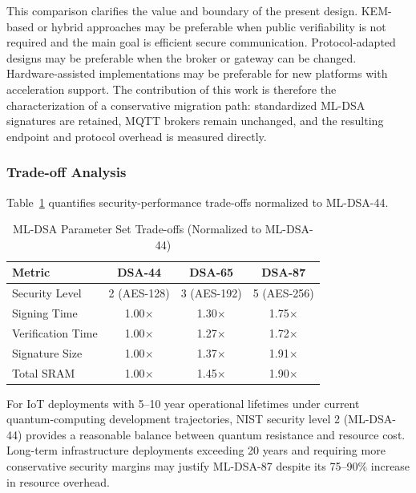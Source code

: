 \documentclass[final, twoside]{IEEEtran} %
\begin{document}
This comparison clarifies the value and boundary of the present design. KEM-based or hybrid approaches may be preferable when public verifiability is not required and the main goal is efficient secure communication. Protocol-adapted designs may be preferable when the broker or gateway can be changed. Hardware-assisted implementations may be preferable for new platforms with acceleration support. The contribution of this work is therefore the characterization of a conservative migration path: standardized ML-DSA signatures are retained, MQTT brokers remain unchanged, and the resulting endpoint and protocol overhead is measured directly.

\subsubsection{Trade-off Analysis}

Table~\ref{tab:parameter-tradeoffs} quantifies security-performance trade-offs normalized to ML-DSA-44.

\begin{table}[h]
	\centering
	\caption{ML-DSA Parameter Set Trade-offs (Normalized to ML-DSA-44)}
	\label{tab:parameter-tradeoffs}
	\begin{tabular}{lccc}
		\toprule
		\textbf{Metric}   & \textbf{DSA-44} & \textbf{DSA-65} & \textbf{DSA-87} \\
		\midrule
		Security Level    & 2 (AES-128)     & 3 (AES-192)     & 5 (AES-256)     \\
		Signing Time      & 1.00$\times$    & 1.30$\times$    & 1.75$\times$    \\
		Verification Time & 1.00$\times$    & 1.27$\times$    & 1.72$\times$    \\
		Signature Size    & 1.00$\times$    & 1.37$\times$    & 1.91$\times$    \\
		Total SRAM        & 1.00$\times$    & 1.45$\times$    & 1.90$\times$    \\
		\bottomrule
	\end{tabular}
\end{table}

For IoT deployments with 5--10 year operational lifetimes under current quantum-computing development trajectories, NIST security level 2 (ML-DSA-44) provides a reasonable balance between quantum resistance and resource cost. Long-term infrastructure deployments exceeding 20 years and requiring more conservative security margins may justify ML-DSA-87 despite its 75--90\% increase in resource overhead.
\end{document}
